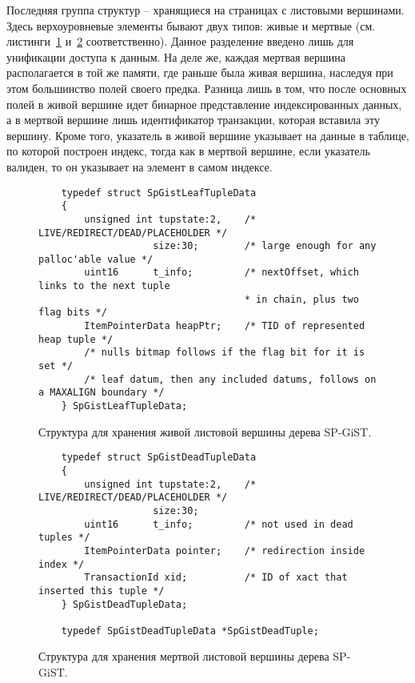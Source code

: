 \documentclass[12pt,oneside]{amsart}
\begin{document}
Последняя группа структур -- хранящиеся на страницах с листовыми вершинами. Здесь верхоуровневые элементы бывают двух типов: живые и мертвые (см. листинги~\ref{spLeaf} и~\ref{spDeadLeaf} соответственно). Данное разделение введено лишь для унификации доступа к данным. На деле же, каждая мертвая вершина располагается в той же памяти, где раньше была живая вершина, наследуя при этом большинство полей своего предка. Разница лишь в том, что после основных полей в живой вершине идет бинарное представление индексированных данных, а в мертвой вершине лишь идентификатор транзакции, которая вставила эту вершину. Кроме того, указатель в живой вершине указывает на данные в таблице, по которой построен индекс, тогда как в мертвой вершине, если указатель валиден, то он указывает на элемент в самом индексе.

\begin{figure}[ht]
\begin{lstlisting}
	typedef struct SpGistLeafTupleData
	{
		unsigned int tupstate:2,	/* LIVE/REDIRECT/DEAD/PLACEHOLDER */
					size:30;		/* large enough for any palloc'able value */
		uint16		t_info;			/* nextOffset, which links to the next tuple
									* in chain, plus two flag bits */
		ItemPointerData heapPtr;	/* TID of represented heap tuple */
		/* nulls bitmap follows if the flag bit for it is set */
		/* leaf datum, then any included datums, follows on a MAXALIGN boundary */
	} SpGistLeafTupleData;
\end{lstlisting}
\caption{Структура для хранения живой листовой вершины дерева SP-GiST.}\label{spLeaf}
\end{figure}


\begin{figure}[ht]
\begin{lstlisting}
	typedef struct SpGistDeadTupleData
	{
		unsigned int tupstate:2,	/* LIVE/REDIRECT/DEAD/PLACEHOLDER */
					size:30;
		uint16		t_info;			/* not used in dead tuples */
		ItemPointerData pointer;	/* redirection inside index */
		TransactionId xid;			/* ID of xact that inserted this tuple */
	} SpGistDeadTupleData;

	typedef SpGistDeadTupleData *SpGistDeadTuple;
\end{lstlisting}
\caption{Структура для хранения мертвой листовой вершины дерева SP-GiST.}\label{spDeadLeaf}
\end{figure}
\end{document}
